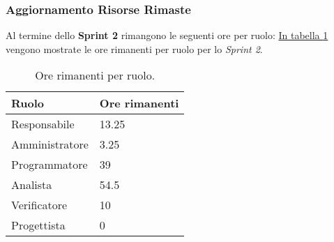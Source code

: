 \subsubsection{Aggiornamento Risorse Rimaste}
Al termine dello \textbf{Sprint 2} rimangono le seguenti ore per ruolo: \hyperref[tab:sprint2_ore_rimanenti]{In tabella \ref{tab:sprint2_ore_rimanenti}} vengono mostrate le ore rimanenti per ruolo per lo \textit{Sprint 2}.

\begin{table}[H]
    \centering
    \begin{tabular}{| l | l |}
    \hline
    \textbf{Ruolo} & 
    \textbf{Ore rimanenti}\\
    \hline
        Responsabile & 13.25\\
    \hline
        Amministratore & 3.25\\
    \hline
        Programmatore & 39\\
    \hline
        Analista & 54.5\\
    \hline
        Verificatore & 10 \\
    \hline
        Progettista & 0\\
    \hline
    \end{tabular}
    \caption{Ore rimanenti per ruolo.}
    \label{tab:sprint2_ore_rimanenti} 
\end{table}